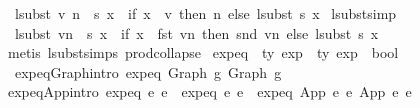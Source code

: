 \begin{isabellebody}
\ \ {\isachardoublequoteopen}lsubst\ {\isacharparenleft}{\kern0pt}{\isacharparenleft}{\kern0pt}v{\isacharcomma}{\kern0pt}\ n{\isacharparenright}{\kern0pt}\ {\isacharhash}{\kern0pt}\ s{\isacharparenright}{\kern0pt}\ x\ {\isacharequal}{\kern0pt}\ {\isacharparenleft}{\kern0pt}if\ x\ {\isacharequal}{\kern0pt}\ v\ then\ n\ else\ lsubst\ s\ x{\isacharparenright}{\kern0pt}{\isachardoublequoteclose}\isanewline
\isanewline
\isanewline
{}\isamarkupfalse%
\ lsubst{\isacharunderscore}{\kern0pt}simp{\isacharcolon}{\kern0pt}\isanewline
\ \ {\isachardoublequoteopen}lsubst\ {\isacharparenleft}{\kern0pt}vn\ {\isacharhash}{\kern0pt}\ s{\isacharparenright}{\kern0pt}\ x\ {\isacharequal}{\kern0pt}\ {\isacharparenleft}{\kern0pt}if\ x\ {\isacharequal}{\kern0pt}\ fst\ vn\ then\ snd\ vn\ else\ lsubst\ s\ x{\isacharparenright}{\kern0pt}{\isachardoublequoteclose}\isanewline
%
\isadelimproof
%
\endisadelimproof
%
\isatagproof
{}\isamarkupfalse%
\ {\isacharparenleft}{\kern0pt}metis\ lsubst{\isachardot}{\kern0pt}simps{\isacharparenleft}{\kern0pt}{}{\isacharparenright}{\kern0pt}\ prod{\isachardot}{\kern0pt}collapse{\isacharparenright}{\kern0pt}%
\endisatagproof
{\isafoldproof}%
%
\isadelimproof
%
\endisadelimproof
%
\isadelimdocument
%
\endisadelimdocument
%
\isatagdocument
%
\isamarkuptrue%
%
\endisatagdocument
{\isafolddocument}%
%
\isadelimdocument
%
\endisadelimdocument
{}\isamarkupfalse%
\ expeq\ {\isacharcolon}{\kern0pt}{\isacharcolon}{\kern0pt}\ {\isachardoublequoteopen}{\isacharprime}{\kern0pt}ty\ exp\ {\isacharequal}{\kern0pt}{\isachargreater}{\kern0pt}\ {\isacharprime}{\kern0pt}ty\ exp\ {\isacharequal}{\kern0pt}{\isachargreater}{\kern0pt}\ bool{\isachardoublequoteclose}\ \isanewline
\ \ expeq{\isacharunderscore}{\kern0pt}Graph{\isacharbrackleft}{\kern0pt}intro{\isacharbrackright}{\kern0pt}{\isacharcolon}{\kern0pt}\ {\isachardoublequoteopen}expeq\ {\isacharparenleft}{\kern0pt}Graph\ g{}{\isacharparenright}{\kern0pt}\ {\isacharparenleft}{\kern0pt}Graph\ g{}{\isacharparenright}{\kern0pt}{\isachardoublequoteclose}\isanewline
{\isacharbar}{\kern0pt}\ expeq{\isacharunderscore}{\kern0pt}App{\isacharbrackleft}{\kern0pt}intro{\isacharbrackright}{\kern0pt}{\isacharcolon}{\kern0pt}\ {\isachardoublequoteopen}expeq\ e{}{}\ e{}{}\ {\isacharequal}{\kern0pt}{\isacharequal}{\kern0pt}{\isachargreater}{\kern0pt}\ expeq\ e{}{}\ e{}{}\ {\isacharequal}{\kern0pt}{\isacharequal}{\kern0pt}{\isachargreater}{\kern0pt}\ expeq\ {\isacharparenleft}{\kern0pt}App\ e{}{}\ e{}{}{\isacharparenright}{\kern0pt}\ {\isacharparenleft}{\kern0pt}App\ e{}{}\ e{}{}{\isacharparenright}{\kern0pt}{\isachardoublequoteclose}\isanewline

\end{isabellebody}
